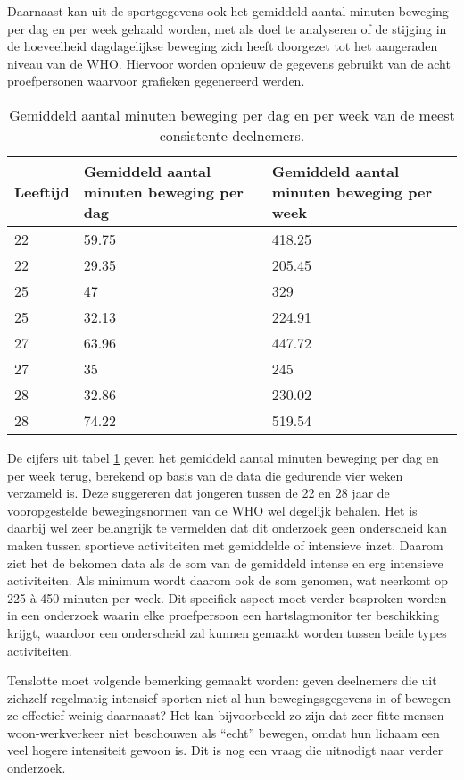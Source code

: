 Daarnaast kan uit de sportgegevens ook het gemiddeld aantal minuten beweging per dag en per week gehaald worden, met als doel te analyseren of de stijging in de hoeveelheid dagdagelijkse beweging zich heeft doorgezet tot het aangeraden niveau van de WHO. Hiervoor worden opnieuw de gegevens gebruikt van de acht proefpersonen waarvoor grafieken gegenereerd werden.

\begin{table}[h]
    \caption[Gemiddeld aantal minuten beweging per dag en per week]{Gemiddeld aantal minuten beweging per dag en per week van de meest consistente deelnemers.}
    \centering
    \label{table:gemiddeldes}
\begin{tabular}{||m{.2\linewidth} m{.4\linewidth} m{.4\linewidth}||}
    \hline
    Leeftijd & Gemiddeld aantal minuten beweging per dag & Gemiddeld aantal minuten beweging per week \\ [0.5ex]
    \hline\hline
    22 & 59.75 & 418.25 \\
    22 & 29.35 & 205.45 \\
    25 & 47 & 329 \\
    25 & 32.13 & 224.91 \\
    27 & 63.96 & 447.72 \\
    27 & 35 & 245 \\
    28 & 32.86 & 230.02 \\
    28 & 74.22 & 519.54 \\ [1ex]
    \hline
\end{tabular}
\end{table}

De cijfers uit tabel \ref{table:gemiddeldes} geven het gemiddeld aantal minuten beweging per dag en per week terug, berekend op basis van de data die gedurende vier weken verzameld is.
Deze suggereren dat jongeren tussen de 22 en 28 jaar de vooropgestelde bewegingsnormen van de WHO wel degelijk behalen.
Het is daarbij wel zeer belangrijk te vermelden dat dit onderzoek geen onderscheid kan maken tussen sportieve activiteiten met gemiddelde of intensieve inzet. Daarom ziet het de bekomen data als de som van de gemiddeld intense en erg intensieve activiteiten. Als minimum wordt daarom ook de som genomen, wat neerkomt op 225 à 450 minuten per week. Dit specifiek aspect moet verder besproken worden in een onderzoek waarin elke proefpersoon een hartslagmonitor ter beschikking krijgt, waardoor een onderscheid zal kunnen gemaakt worden tussen beide types activiteiten.

Tenslotte moet volgende bemerking gemaakt worden: geven deelnemers die uit zichzelf regelmatig intensief sporten niet al hun bewegingsgegevens in of bewegen ze effectief weinig daarnaast? Het kan bijvoorbeeld zo zijn dat zeer fitte mensen woon-werkverkeer niet beschouwen als ``echt'' bewegen, omdat hun lichaam een veel hogere intensiteit gewoon is. Dit is nog een vraag die uitnodigt naar verder onderzoek.

